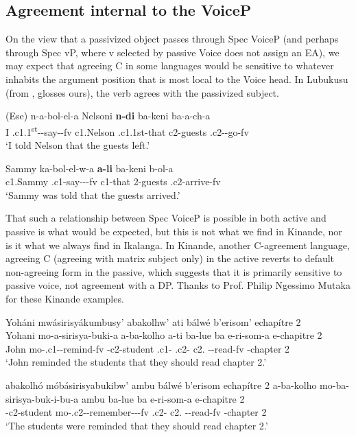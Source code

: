 \documentclass[output=paper,
modfonts
]{langscibook}
\begin{document}
\subsection{Agreement internal to the VoiceP}\label{s3.1}

On the view that a passivized object passes through Spec VoiceP (and perhaps through Spec vP, where v selected by passive Voice does not assign an EA), we may expect that agreeing C in some languages would be sensitive to whatever inhabits the argument position that is most local to the Voice head. In Lubukusu  (from \citealt[368]{Diercks2013}, glosses ours), the verb agrees with the passivized subject.

\ea\label{29}
\ea \gll (Ese) n-a-bol-el-a Nelsoni \textbf{n-di} ba-keni ba-a-ch-a \label{29a}\\
          I .c1.1\textsuperscript{st}--say--fv c1.Nelson .c1.1st-that c2-guests
          .c2--go-fv\\
		\glt `I told Nelson that the guests left.'

\ex \gll Sammy ka-bol-el-w-a \textbf{a-li} ba-keni b-ol-a\label{29b}\\
		c1.Sammy .c1-say---fv c1-that 2-guests .c2-arrive-fv\\
	\glt `Sammy was told that the guests arrived.' \z\z

That such a relationship between Spec VoiceP is possible in both active and passive is what would be expected, but this is not what we find in Kinande, nor is it what we always find in Ikalanga. In Kinande, another C-agreement language, agreeing C (agreeing with matrix subject only) in the active reverts to default non-agreeing form in the passive, which suggests that it is primarily sensitive to passive voice, not agreement with a DP. Thanks to Prof. Philip Ngessimo Mutaka for these Kinande examples.

\ea \label{30}
\ea	Yoháni mwásirisyákumbusy’ 	abakolhw’ 	ati bálwé b’erisom’  echapítre 2\\
	\gll Yohani mo-a-sirisya-buki-a  a-ba-kolho a-ti ba-lue ba
    e-ri-som-a {e-chapitre 2}\\
	John     mo-.c1--remind-fv -c2-student .c1-    .c2- c2. 		--read-fv {-chapter 2} \\
	\glt `John reminded the students that they should read chapter 2.'

\ex abakolhó móbásirisyabukibw’ ambu bálwé b’erisom echapítre 2
	\gll a-ba-kolho mo-ba-sirisya-buk-i-bu-a ambu   ba-lue ba
    e-ri-som-a {e-chapitre 2}\\
	-c2-student mo-.c2--remember---fv  .c2- c2. 	 --read-fv  {-chapter 2}\\
    \glt `The students were reminded that they should read chapter 2.'
    \z \z
\end{document}
